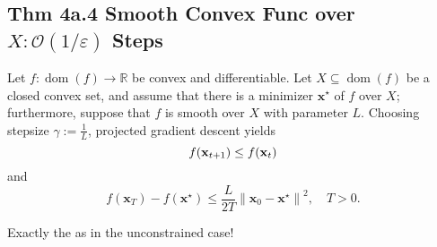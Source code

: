 \subsection*{Thm 4a.4 Smooth Convex Func over $X: \mathcal{O}(1 / \varepsilon)$ Steps}
Let $f: \operatorname{dom}(f) \rightarrow \mathbb{R}$ be convex and differentiable. Let $X \subseteq \operatorname{dom}(f)$ be a closed convex set, and assume that there is a minimizer $\mathbf{x}^{\star}$ of $f$ over $X$; furthermore, suppose that $f$ is smooth over $X$ with parameter $L$. Choosing stepsize $\gamma:=\frac{1}{L}$, projected gradient descent yields
$$
f(\operatorname{\boldsymbol{\mathbf{x}}}_{t+1}) \leq f(\operatorname{\boldsymbol{\mathbf{x}}}_t)
$$
and
$$
f\left(\mathbf{x}_{T}\right)-f\left(\mathbf{x}^{\star}\right) \leq \frac{L}{2 T}\left\|\mathbf{x}_{0}-\mathbf{x}^{\star}\right\|^{2}, \quad T>0 .
$$

Exactly the  as in the unconstrained case!